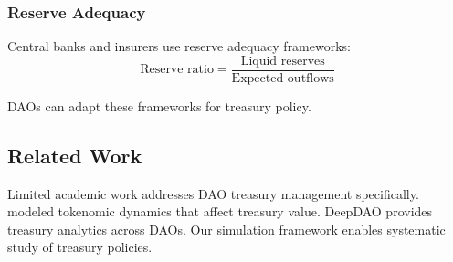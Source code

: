 \subsubsection{Reserve Adequacy}

Central banks and insurers use reserve adequacy frameworks:
\begin{equation}
\text{Reserve ratio} = \frac{\text{Liquid reserves}}{\text{Expected outflows}}
\end{equation}

DAOs can adapt these frameworks for treasury policy.

\subsection{Related Work}

Limited academic work addresses DAO treasury management specifically. \citet{faqir2021cadcad} modeled tokenomic dynamics that affect treasury value. DeepDAO \citep{deepdao2023analytics} provides treasury analytics across DAOs. Our simulation framework enables systematic study of treasury policies.
